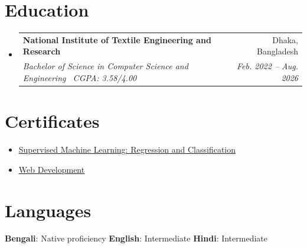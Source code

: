 \documentclass[letterpaper,11pt]{article}
\makeatletter
\newcommand{\resumeItem}[1]{
  \item\small{
    {#1 \vspace{-2pt}}
  }
}
\newcommand{\resumeSubheading}[4]{
  \vspace{-2pt}\item
    \begin{tabular*}{0.97\textwidth}[t]{l@{\extracolsep{\fill}}r}
      \textbf{#1} & #2 \\
      \textit{\small#3} & \textit{\small #4} \\
    \end{tabular*}\vspace{-7pt}
}
\newcommand{\resumeSubItem}[1]{\resumeItem{#1}\vspace{-4pt}}
\newcommand{\resumeSubHeadingListStart}{\begin{itemize}[leftmargin=0.15in, label={}]}
\newcommand{\resumeSubHeadingListEnd}{\end{itemize}}
\makeatother
\begin{document}
\section{Education}
  \resumeSubHeadingListStart
    \resumeSubheading
      {National Institute of Textile Engineering and Research}{Dhaka, Bangladesh}
      {Bachelor of Science in Computer Science and Engineering \textemdash\ CGPA: 3.58/4.00}{Feb. 2022 -- Aug. 2026}
  \resumeSubHeadingListEnd

\section{Certificates}
  \resumeSubHeadingListStart
    \resumeSubItem{\href{https://www.coursera.org}{\underline{Supervised Machine Learning: Regression and Classification}}}
    \resumeSubItem{\href{https://www.coursera.org}{\underline{Web Development}}}
  \resumeSubHeadingListEnd

\section{Languages}
 \begin{itemize}[leftmargin=0.15in, label={}]
    \small{\item{
     \textbf{Bengali}{: Native proficiency} \quad
     \textbf{English}{: Intermediate} \quad
     \textbf{Hindi}{: Intermediate}
    }}
 \end{itemize}

\end{document}
